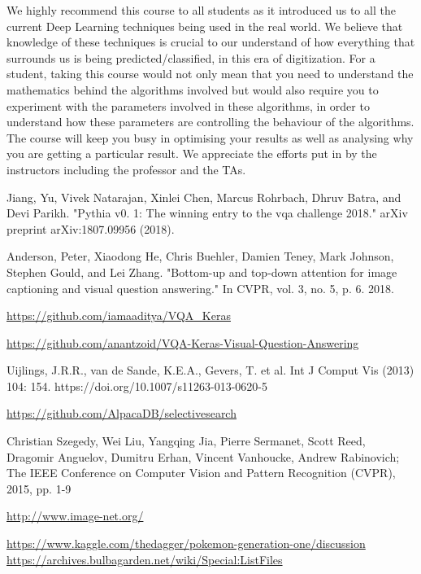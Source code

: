 \documentclass[journal, a4paper]{IEEEtran}
\begin{document}
We highly recommend this course to all students as it introduced us to all the current Deep Learning techniques being used in the real world. We believe that knowledge of these techniques is crucial to our understand of how everything that surrounds us is being predicted/classified, in this era of digitization. For a student, taking this course would not only mean that you need to understand the mathematics behind the algorithms involved but would also require you to experiment with the parameters involved in these algorithms, in order to understand how these parameters are controlling the behaviour of the algorithms. The course will keep you busy in optimising your results as well as analysing why you are getting a particular result. We appreciate the efforts put in by the instructors including the professor and the TAs. 
\begin{thebibliography}{5}

	Jiang, Yu, Vivek Natarajan, Xinlei Chen, Marcus Rohrbach, Dhruv Batra, and Devi Parikh. "Pythia v0. 1: The winning entry to the vqa challenge 2018." arXiv preprint arXiv:1807.09956 (2018).
	
	Anderson, Peter, Xiaodong He, Chris Buehler, Damien Teney, Mark Johnson, Stephen Gould, and Lei Zhang. "Bottom-up and top-down attention for image captioning and visual question answering." In CVPR, vol. 3, no. 5, p. 6. 2018.
	
	\url{https://github.com/iamaaditya/VQA_Keras}
	
	\url{https://github.com/anantzoid/VQA-Keras-Visual-Question-Answering}
	
	Uijlings, J.R.R., van de Sande, K.E.A., Gevers, T. et al. Int J Comput Vis (2013) 104: 154. https://doi.org/10.1007/s11263-013-0620-5
	
	\url{https://github.com/AlpacaDB/selectivesearch}
	
	Christian Szegedy, Wei Liu, Yangqing Jia, Pierre Sermanet, Scott Reed, Dragomir Anguelov, Dumitru Erhan, Vincent Vanhoucke, Andrew Rabinovich; The IEEE Conference on Computer Vision and Pattern Recognition (CVPR), 2015, pp. 1-9
	
	\url{http://www.image-net.org/}
	
	\url{https://www.kaggle.com/thedagger/pokemon-generation-one/discussion}
	\url{https://archives.bulbagarden.net/wiki/Special:ListFiles}
	

\end{thebibliography}
\end{document}
